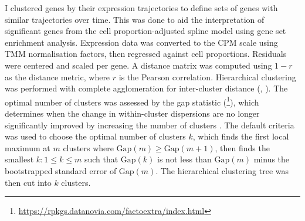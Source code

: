 I clustered genes by their expression trajectories to define sets of genes with similar trajectories over time.
This was done to aid the interpretation of significant genes from the cell proportion-adjusted spline model using gene set enrichment analysis.
Expression data was converted to the \gls{CPM} scale using \gls{TMM} normalisation factors, then regressed against cell proportions.
Residuals were centered and scaled per gene.
A distance matrix was computed using $1 - r$ as the distance metric, where $r$ is the Pearson correlation.
Hierarchical clustering was performed with complete agglomeration for inter-cluster distance (, \autocite{mullner2013FastclusterFastHierarchical}).
The optimal number of clusters was assessed by the gap statistic (\footnote{\url{https://rpkgs.datanovia.com/factoextra/index.html}}),
which determines when the change in within-cluster dispersions are no longer significantly improved by increasing the number of clusters \autocite{tibshirani2001EstimatingNumberClusters}.
%
%
The default  criteria was used to choose the optimal number of clusters $k$,
which finds the first local maximum at $m$ clusters where $\text{Gap}(m) \ge \text{Gap}(m+1)$,
then finds the smallest $k : 1 \le k \le m$ such that $\text{Gap}(k)$ is not less than $\text{Gap}(m)$ minus the bootstrapped standard error of $\text{Gap}(m)$.
%
%
The hierarchical clustering tree was then cut into $k$ clusters.

